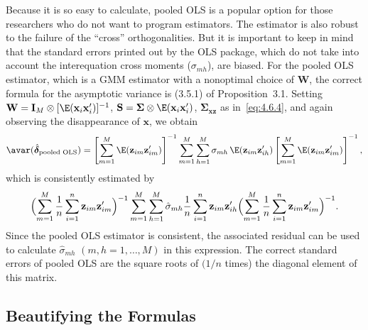 Because it is so easy to calculate, pooled OLS is a popular option for those
researchers who do not want to program estimators. The estimator is also robust
to the failure of the ``cross'' orthogonalities. But it is important to keep in mind
that the standard errors printed out by the OLS package, which do not take into
account the interequation cross moments ($\sigma_{mh}$), are biased.
For the pooled OLS estimator, which is a GMM estimator with a nonoptimal choice of
$\hat{\mathbf{W}}$, the correct formula for the asymptotic variance is (3.5.1)
of Proposition~3.1. Setting
$\mathbf{W} = \mathbf{I}_M \otimes [\E(\mathbf{x}_i \mathbf{x}_i')]^{-1}$,
$\mathbf{S} = \boldsymbol{\Sigma} \otimes \E(\mathbf{x}_i \mathbf{x}_i')$,
$\boldsymbol{\Sigma}_{\mathbf{xz}}$ as in~\eqref{eq:4.6.4}, and again observing the
disappearance of $\mathbf{x}$, we obtain
\begin{equation}
\avar(\hat{\boldsymbol{\delta}}_{\text{pooled OLS}})
= \left[\sum_{m=1}^{M} \E(\mathbf{z}_{im} \mathbf{z}_{im}')\right]^{-1}
\sum_{m=1}^{M} \sum_{h=1}^{M}
\sigma_{mh}\, \E(\mathbf{z}_{im} \mathbf{z}_{ih}')
\left[\sum_{m=1}^{M} \E(\mathbf{z}_{im} \mathbf{z}_{im}')\right]^{-1},
\label{eq:4.6.13}
\end{equation}
which is consistently estimated by
\begin{equation}
\Bigl(\sum_{m=1}^{M} \frac{1}{n} \sum_{i=1}^{n}
\mathbf{z}_{im} \mathbf{z}_{im}'\Bigr)^{-1}
\sum_{m=1}^{M} \sum_{h=1}^{M}
\hat{\sigma}_{mh} \frac{1}{n} \sum_{i=1}^{n}
\mathbf{z}_{im} \mathbf{z}_{ih}'
\Bigl(\sum_{m=1}^{M} \frac{1}{n} \sum_{i=1}^{n}
\mathbf{z}_{im} \mathbf{z}_{im}'\Bigr)^{-1}.
\label{eq:4.6.14}
\end{equation}
Since the pooled OLS estimator is consistent, the associated residual can be used to
calculate $\hat{\sigma}_{mh}$ $(m, h = 1, \ldots, M)$ in this expression.
The correct standard errors of pooled OLS are the square roots of $(1/n$ times)
the diagonal element of this matrix.

\subsection*{Beautifying the Formulas}

